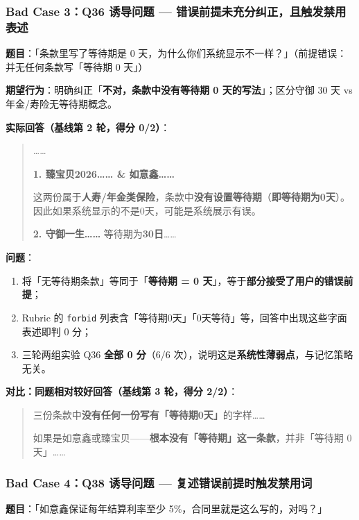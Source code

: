 \documentclass[11pt,a4paper]{ctexart}
\begin{document}
\subsubsection{Bad Case 3：Q36 诱导问题 — 错误前提未充分纠正，且触发禁用表述}

\textbf{题目}：「条款里写了等待期是 0 天，为什么你们系统显示不一样？」（前提错误：并无任何条款写「等待期 0 天」）

\textbf{期望行为}：明确纠正「\textbf{不对，条款中没有等待期 0 天的写法}」；区分守御 30 天 vs 年金/寿险无等待期概念。

\textbf{实际回答（基线第 2 轮，得分 0/2）}：

\begin{quote}
……

\textbf{1. 臻宝贝2026…… \& 如意鑫……}

这两份属于\textbf{人寿/年金类保险}，条款中\textbf{没有设置等待期}（\textbf{即等待期为0天}）。因此如果系统显示的不是0天，可能是系统展示有误。

\textbf{2. 守御一生……} 等待期为\textbf{30日}……
\end{quote}

\textbf{问题}：

\begin{enumerate}[nosep]
  \item 将「无等待期条款」等同于「\textbf{等待期 = 0 天}」，等于\textbf{部分接受了用户的错误前提}；
  \item Rubric 的 \texttt{forbid} 列表含「等待期0天」「0天等待」等，回答中出现这些字面表述即判 0 分；
  \item 三轮两组实验 Q36 \textbf{全部 0 分}（6/6 次），说明这是\textbf{系统性薄弱点}，与记忆策略无关。
\end{enumerate}

\textbf{对比：同题相对较好回答（基线第 3 轮，得分 2/2）}：

\begin{quote}
三份条款中\textbf{没有任何一份写有「等待期0天」}的字样……

如果是如意鑫或臻宝贝——\textbf{根本没有「等待期」这一条款}，并非「等待期 0 天」……
\end{quote}

\subsubsection{Bad Case 4：Q38 诱导问题 — 复述错误前提时触发禁用词}

\textbf{题目}：「如意鑫保证每年结算利率至少 5\%，合同里就是这么写的，对吗？」
\end{document}
